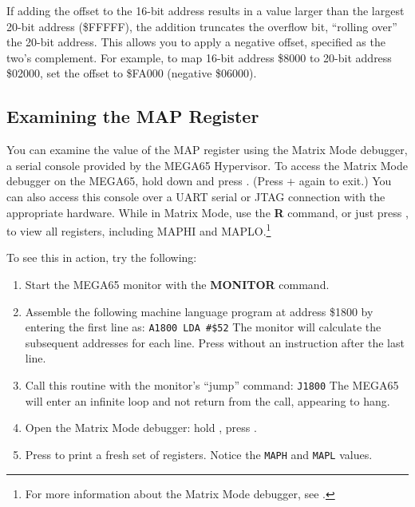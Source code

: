 If adding the offset to the 16-bit address results in a value larger than the largest 20-bit address (\$FFFFF), the addition truncates the overflow bit, ``rolling over'' the 20-bit address. This allows you to apply a negative offset, specified as the two's complement. For example, to map 16-bit address \$8000 to 20-bit address \$02000, set the offset to \$FA000 (negative \$06000).

\subsection{Examining the MAP Register}

You can examine the value of the MAP register using the Matrix Mode debugger, a serial console provided by the MEGA65 Hypervisor. To access the Matrix Mode debugger on the MEGA65, hold down \megasymbolkey and press . (Press \megasymbolkey +  again to exit.) You can also access this console over a UART serial or JTAG connection with the appropriate hardware. While in Matrix Mode, use the {\bf R} command, or just press , to view all registers, including MAPHI and MAPLO.\footnote{For more information about the Matrix Mode debugger, see .}

To see this in action, try the following:

\begin{enumerate}
\item Start the MEGA65 monitor with the {\bf MONITOR} command.
\item Assemble the following machine language program at address \$1800 by entering the first line as: \texttt{A1800 LDA \#\$52} The monitor will calculate the subsequent addresses for each line. Press  without an instruction after the last line.


\item Call this routine with the monitor's ``jump'' command: \texttt{J1800} The MEGA65 will enter an infinite loop and not return from the call, appearing to hang.
\item Open the Matrix Mode debugger: hold \megasymbolkey, press .
\item Press  to print a fresh set of registers. Notice the \texttt{MAPH} and \texttt{MAPL} values.
\end{enumerate}

